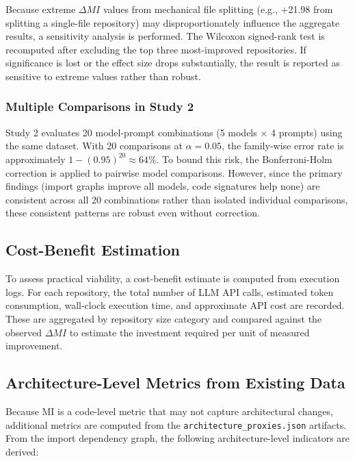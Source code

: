 Because extreme $\Delta MI$ values from mechanical file splitting (e.g., +21.98 from splitting a single-file repository) may disproportionately influence the aggregate results, a sensitivity analysis is performed. The Wilcoxon signed-rank test is recomputed after excluding the top three most-improved repositories. If significance is lost or the effect size drops substantially, the result is reported as sensitive to extreme values rather than robust.

\subsubsection{Multiple Comparisons in Study 2}
\label{subsec:met_multcomp}

Study 2 evaluates 20 model-prompt combinations (5 models $\times$ 4 prompts) using the same dataset. With 20 comparisons at $\alpha = 0.05$, the family-wise error rate is approximately $1 - (0.95)^{20} \approx 64\%$. To bound this risk, the Bonferroni-Holm correction is applied to pairwise model comparisons. However, since the primary findings (import graphs improve all models, code signatures help none) are consistent across all 20 combinations rather than isolated individual comparisons, these consistent patterns are robust even without correction.

\subsection{Cost-Benefit Estimation}
\label{subsec:met_costbenefit}

To assess practical viability, a cost-benefit estimate is computed from execution logs. For each repository, the total number of LLM API calls, estimated token consumption, wall-clock execution time, and approximate API cost are recorded. These are aggregated by repository size category and compared against the observed $\Delta MI$ to estimate the investment required per unit of measured improvement.

\subsection{Architecture-Level Metrics from Existing Data}
\label{subsec:met_archmetrics}

Because MI is a code-level metric that may not capture architectural changes, additional metrics are computed from the \texttt{architecture\_proxies.json} artifacts. From the import dependency graph, the following architecture-level indicators are derived:

